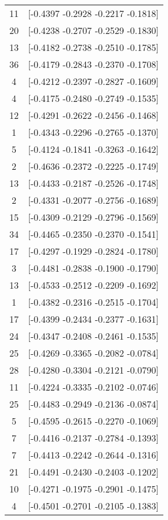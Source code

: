 \documentclass[12pt, fullpage,letterpaper]{article}
\begin{document}
\begin{enumerate}
\begin{enumerate}
{\begin{longtable}{|c|c|}
			 11 &  [-0.4397 -0.2928 -0.2217 -0.1818] \\
			 20 &  [-0.4238 -0.2707 -0.2529 -0.1830] \\
			 13 &  [-0.4182 -0.2738 -0.2510 -0.1785] \\
			 36 &  [-0.4179 -0.2843 -0.2370 -0.1708] \\
			  4 &  [-0.4212 -0.2397 -0.2827 -0.1609] \\
			  4 &  [-0.4175 -0.2480 -0.2749 -0.1535] \\
			 12 &  [-0.4291 -0.2622 -0.2456 -0.1468] \\
			  1 &  [-0.4343 -0.2296 -0.2765 -0.1370] \\
			  5 &  [-0.4124 -0.1841 -0.3263 -0.1642] \\
			  2 &  [-0.4636 -0.2372 -0.2225 -0.1749] \\
			 13 &  [-0.4433 -0.2187 -0.2526 -0.1748] \\
			  2 &  [-0.4331 -0.2077 -0.2756 -0.1689] \\
			 15 &  [-0.4309 -0.2129 -0.2796 -0.1569] \\
			 34 &  [-0.4465 -0.2350 -0.2370 -0.1541] \\
			 17 &  [-0.4297 -0.1929 -0.2824 -0.1780] \\
			  3 &  [-0.4481 -0.2838 -0.1900 -0.1790] \\
			 13 &  [-0.4533 -0.2512 -0.2209 -0.1692] \\
			  1 &  [-0.4382 -0.2316 -0.2515 -0.1704] \\
			 17 &  [-0.4399 -0.2434 -0.2377 -0.1631] \\
			 24 &  [-0.4347 -0.2408 -0.2461 -0.1535] \\
			 25 &  [-0.4269 -0.3365 -0.2082 -0.0784] \\
			 28 &  [-0.4280 -0.3304 -0.2121 -0.0790] \\
			 11 &  [-0.4224 -0.3335 -0.2102 -0.0746] \\
			 25 &  [-0.4483 -0.2949 -0.2136 -0.0874] \\
			  5 &  [-0.4595 -0.2615 -0.2270 -0.1069] \\
			  7 &  [-0.4416 -0.2137 -0.2784 -0.1393] \\
			  7 &  [-0.4413 -0.2242 -0.2644 -0.1316] \\
			 21 &  [-0.4491 -0.2430 -0.2403 -0.1202] \\
			 10 &  [-0.4271 -0.1975 -0.2901 -0.1475] \\
			  4 &  [-0.4501 -0.2701 -0.2105 -0.1383] \\

\end{longtable}}
\end{enumerate}
\end{enumerate}
\end{document}
